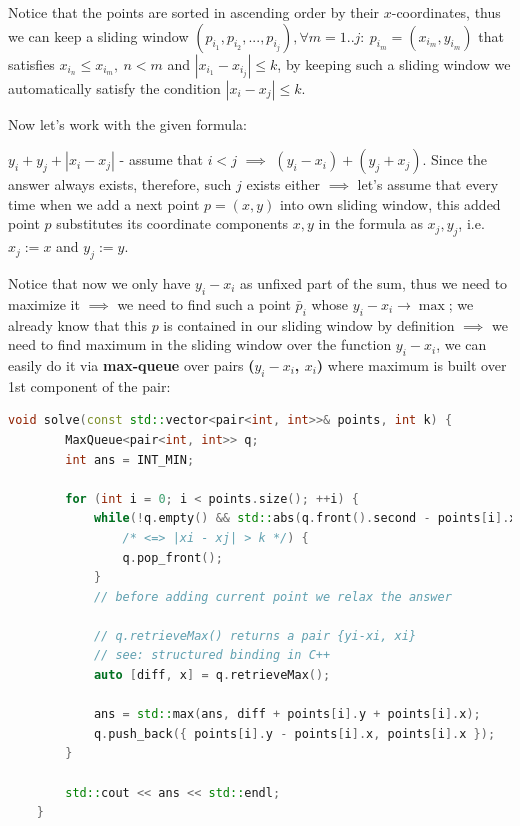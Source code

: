 \begin{solution}

    Notice that the points are sorted in ascending order by their $x$-coordinates, thus we can keep a sliding window $(p_{i_1}, p_{i_2}, ..., p_{i_j}), \forall m=1..j: \ p_{i_m} = (x_{i_m}, y_{i_m})$ that satisfies $x_{i_n} \leq x_{i_m}, \ n < m$ and $|x_{i_1} - x_{i_j}| \leq k$, by keeping such a sliding window we automatically satisfy the condition $|x_i - x_j| \leq k$.

    Now let's work with the given formula:

    $y_i + y_j + |x_i - x_j|$ - assume that $i < j$ $\implies$ $(y_i-x_i) + (y_j+x_j)$. Since the answer always exists, therefore, such $j$ exists either $\implies$ let's assume that every time when we add a next point $p = (x, y)$ into own sliding window, this added point $p$ substitutes its coordinate components $x, y$ in the formula as $x_j, y_j$, i.e. $x_j := x$ and $y_j := y$.

    Notice that now we only have $y_i-x_i$ as unfixed part of the sum, thus we need to maximize it $\implies$ we need to find such a point $\bar{p}_i$ whose $y_i-x_i \to \max$; we already know that this $p$ is contained in our sliding window by definition $\implies$ we need to find maximum in the sliding window over the function $y_i-x_i$, we can easily do it via \textbf{max-queue} over pairs \textbf{($y_i-x_i$, $x_i$)} where maximum is built over 1st component of the pair:

    \begin{lstlisting}[language=C++]
    void solve(const std::vector<pair<int, int>>& points, int k) {
        MaxQueue<pair<int, int>> q;
        int ans = INT_MIN;

        for (int i = 0; i < points.size(); ++i) {
            while(!q.empty() && std::abs(q.front().second - points[i].x) > k
                /* <=> |xi - xj| > k */) {
                q.pop_front();
            }
            // before adding current point we relax the answer

            // q.retrieveMax() returns a pair {yi-xi, xi}
            // see: structured binding in C++
            auto [diff, x] = q.retrieveMax();

            ans = std::max(ans, diff + points[i].y + points[i].x);
            q.push_back({ points[i].y - points[i].x, points[i].x });
        }

        std::cout << ans << std::endl;
    }
    \end{lstlisting}



\end{solution}